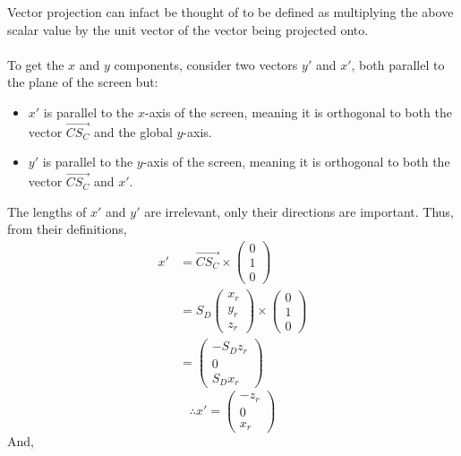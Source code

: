 \documentclass{article}
\newcommand\xp{x\prime\xspace}
\newcommand\yp{y\prime\xspace}
\begin{document}
	Vector projection can infact be thought of to be defined as multiplying the above scalar value by the unit vector of the vector being projected onto.
	\paragraph{}
	To get the $x$ and $y$ components, consider two vectors $\yp$ and $\xp$, both parallel to the plane of the screen but:
	\begin{itemize}
		\item $\xp$ is parallel to the $x$-axis of the screen, meaning it is orthogonal to both the vector $\overrightarrow{C S_C}$ and the global $y$-axis.
		\item $\yp$ is parallel to the $y$-axis of the screen, meaning it is orthogonal to both the vector $\overrightarrow{C S_C}$ and $\xp$.
 
	\end{itemize}
	The lengths of $\xp$ and $\yp$ are irrelevant, only their directions are important. Thus, from their definitions, 
	\begin{align*}
			\xp & = \overrightarrow{C S_C} \times \begin{pmatrix} 0\\1\\0 \end{pmatrix}\\
			     & = S_D \begin{pmatrix}x_r\\y_r\\z_r\end{pmatrix} \times \begin{pmatrix} 0\\1\\0 \end{pmatrix}\\
			    & = \begin{pmatrix} -S_D z_r\\ 0\\ S_D x_r \end{pmatrix}
	\end{align*}
	\begin{equation}
		\therefore \xp = \begin{pmatrix} -z_r \\0 \\x_r\end{pmatrix} 
	\end{equation}
	And,
\end{document}
